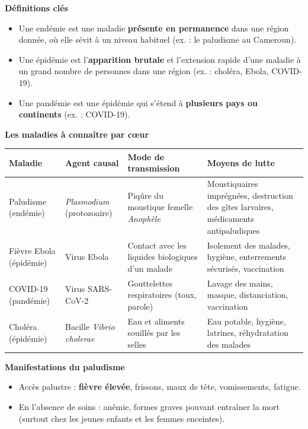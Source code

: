 \documentclass[11pt]{article}
\newcommand{\cle}[1]{{\popxbold\color{popdark}#1}}
\begin{document}
\begin{bilan}
\textbf{Définitions clés}
\begin{itemize}
  \item Une \cle{endémie} est une maladie \textbf{présente en permanence} dans une région donnée, où elle sévit à un niveau habituel (ex. : le paludisme au Cameroun).
  \item Une \cle{épidémie} est l'\textbf{apparition brutale} et l'extension rapide d'une maladie à un grand nombre de personnes dans une région (ex. : choléra, Ebola, COVID-19).
  \item Une \cle{pandémie} est une épidémie qui s'étend à \textbf{plusieurs pays ou continents} (ex. : COVID-19).
\end{itemize}

\textbf{Les maladies à connaître par c\oe ur}
\begin{center}
\begin{tabularx}{\linewidth}{|l|X|X|X|}
\hline
\rowcolor{popblueL} \textbf{Maladie} & \textbf{Agent causal} & \textbf{Mode de transmission} & \textbf{Moyens de lutte} \\
\hline
Paludisme (endémie) & \emph{Plasmodium} (protozoaire) & Piqûre du moustique femelle \emph{Anophèle} & Moustiquaires imprégnées, destruction des gîtes larvaires, médicaments antipaludiques \\
\hline
Fièvre Ebola (épidémie) & Virus Ebola & Contact avec les liquides biologiques d'un malade & Isolement des malades, hygiène, enterrements sécurisés, vaccination \\
\hline
COVID-19 (pandémie) & Virus SARS-CoV-2 & Gouttelettes respiratoires (toux, parole) & Lavage des mains, masque, distanciation, vaccination \\
\hline
Choléra (épidémie) & Bacille \emph{Vibrio cholerae} & Eau et aliments souillés par les selles & Eau potable, hygiène, latrines, réhydratation des malades \\
\hline
\end{tabularx}
\end{center}

\textbf{Manifestations du paludisme}
\begin{itemize}
  \item Accès palustre : \textbf{fièvre élevée}, frissons, maux de tête, vomissements, fatigue.
  \item En l'absence de soins : anémie, formes graves pouvant entraîner la mort (surtout chez les jeunes enfants et les femmes enceintes).
\end{itemize}


\end{bilan}
\end{document}
